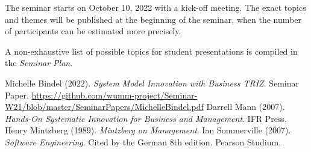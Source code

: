 \documentclass[11pt,a4paper]{article}
\begin{document}
The seminar starts on October 10, 2022 with a kick-off meeting.  The exact
topics and themes will be published at the beginning of the seminar, when the
number of participants can be estimated more precisely.

A non-exhaustive list of possible topics for student presentations is compiled
in the \emph{Seminar Plan}.

\begin{thebibliography}{xxx}
 Michelle Bindel (2022).  \emph{System Model Innovation with
  Business TRIZ}.  Seminar Paper.
  \url{https://github.com/wumm-project/Seminar-W21/blob/master/SeminarPapers/MichelleBindel.pdf}
 Darrell Mann (2007). \emph{Hands-On Systematic Innovation for
  Business and Management}.  IFR Press. 
 Henry Mintzberg (1989).  \emph{Mintzberg on Management}.
 Ian Sommerville (2007).  \emph{Software Engineering}.
  Cited by the German 8th edition. Pearson Studium.
\end{thebibliography}
\end{document}
